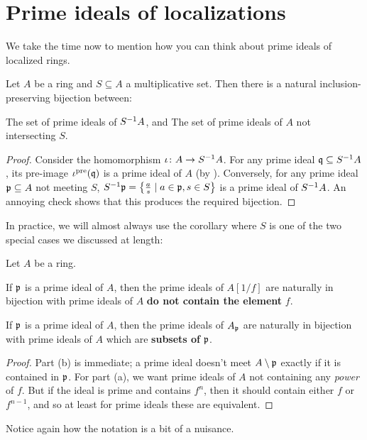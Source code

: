 \section{Prime ideals of localizations}
We take the time now to mention how you can
think about prime ideals of localized rings.
\begin{proposition}
	Let $A$ be a ring and $S \subseteq A$ a multiplicative set.
	Then there is a natural inclusion-preserving bijection between:
	\begin{itemize}
		\ii The set of prime ideals of $S^{-1} A$, and
		\ii The set of prime ideals of $A$ not intersecting $S$.
	\end{itemize}
\end{proposition}
\begin{proof}
	Consider the homomorphism $\iota \colon A \to S^{-1} A$.
	For any prime ideal $\mathfrak q \subseteq S^{-1} A$,
	its pre-image $\iota^{\text{pre}}(\mathfrak q)$ is a prime ideal of $A$
	(by ).
	Conversely, for any prime ideal $\mathfrak p \subseteq A$
	not meeting $S$,
	$S^{-1} \mathfrak p = \left\{ \frac{a}{s} \mid a \in \mathfrak p, s \in S \right\}$
	is a prime ideal of $S^{-1} A$.
	An annoying check shows that this produces the required bijection.
\end{proof}
In practice, we will almost always use the corollary
where $S$ is one of the two special cases we discussed at length:
\begin{corollary}
	Let $A$ be a ring.
	\begin{enumerate}[(a)]
		\ii If $\mathfrak p$ is a prime ideal of $A$,
		then the prime ideals of $A[1/f]$ are naturally
		in bijection with prime ideals of $A$
		\textbf{do not contain the element} $f$.

		\ii If $\mathfrak p$ is a prime ideal of $A$,
		then the prime ideals of $A_\mathfrak p$ are naturally
		in bijection with prime ideals of $A$
		which are \textbf{subsets of} $\mathfrak p$.
	\end{enumerate}
\end{corollary}
\begin{proof}
	Part (b) is immediate; a prime ideal doesn't meet $A \setminus \mathfrak p$
	exactly if it is contained in $\mathfrak p$.
	For part (a), we want prime ideals of $A$ not containing
	any \emph{power} of $f$.
	But if the ideal is prime and contains $f^n$,
	then it should contain either $f$ or $f^{n-1}$,
	and so at least for prime ideals these are equivalent.
\end{proof}
Notice again how the notation is a bit of a nuisance.
